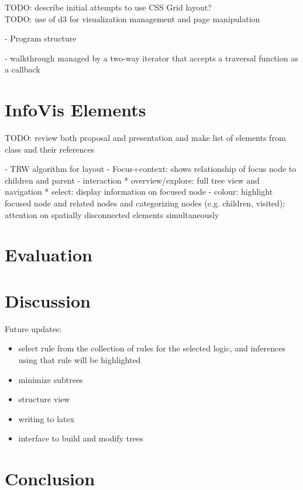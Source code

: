 \documentclass[conference]{IEEEtran}
\begin{document}
TODO: describe initial attempts to use CSS Grid layout? \\

TODO: use of d3 for visualization management and page manipulation


- Program structure

- walkthrough managed by a two-way iterator that accepts a traversal function as a callback

\section{InfoVis Elements}


TODO: review both proposal and presentation and make list of elements from class and their references

- TRW algorithm for layout
- Focus+context: shows relationship of focus node to children and parent
- interaction
  * overview/explore: full tree view and navigation
  * select: display information on focused node
- colour: highlight focused node and related nodes and categorizing nodes (e.g. children, visited); attention on spatially disconnected elements simultaneously

\section{Evaluation}


\section{Discussion}


Future updates:

\begin{itemize}
    \item select rule from the collection of rules for the selected logic, and inferences using that rule will be highlighted
    \item minimize subtrees
    \item structure view
    \item writing to latex
    \item interface to build and modify trees
\end{itemize}


\section{Conclusion}





\end{document}
